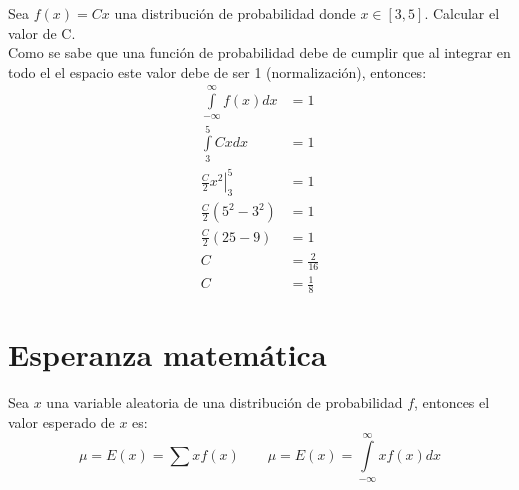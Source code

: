 \begin{ejemplo}
    Sea $f(x)=Cx$ una distribución de probabilidad donde $x\in [3,5]$. Calcular el valor de C.\\
    Como se sabe que una función de probabilidad debe de cumplir que al integrar en todo el el espacio este valor debe de ser 1 (normalización), entonces:
    \begin{align*}
        \int\limits_{-\infty}^{\infty} f(x) dx & = 1            \\
        \int\limits_{3}^{5} Cx dx              & = 1            \\
        \left. \frac{C}{2} x^2\right|_3^5      & = 1            \\
        \frac{C}{2}\left(5^2-3^2\right)        & =1             \\
        \frac{C}{2}\left(25-9\right)           & = 1            \\
        C                                      & = \frac{2}{16} \\
        C                                      & = \frac{1}{8}
    \end{align*}
\end{ejemplo}
\section{Esperanza matemática}
\begin{definicion}
    Sea $x$ una variable aleatoria de una distribución de probabilidad $f$, entonces el valor esperado de $x$ es:
    \begin{equation}
        \mu = E(x) = \sum xf(x) \qquad \mu = E(x) = \int\limits_{-\infty}^\infty xf(x) dx
    \end{equation}
\end{definicion}
